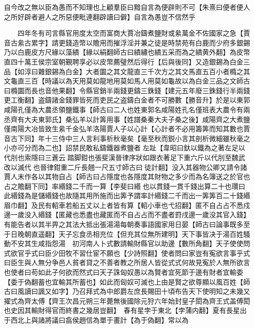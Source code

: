 自今改之無以臣為愚而不知理也上顧羣臣曰黯自言為便辟則不可【朱熹曰便者便人之所好辟者避人之所惡便毗連翻辟讀曰僻】自言為愚豈不信然乎

　　四年冬有司言縣官用度太空而富商大賈冶鑄煮鹽財或絫萬金不佐國家之急【賈音古絫古累字】請更錢造幣以贍用而摧浮淫并兼之徒是時禁苑有白鹿而少府多銀錫乃以白鹿皮方尺緣以藻繢【緣以絹翻師古曰繢繡也繢五采而為之繢黄外翻】為皮幣直四十萬王侯宗室朝覲聘享必以皮幣薦璧然后得行【后與後同】又造銀錫為白金三品【如淳曰雜銀錫為白金】大者圜之其文龍直三千次方之其文馬直五百小者橢之其文龜直三百【時議以為天用莫如龍地用莫如馬人用莫如龜故以為白金三品之文師古曰橢圜而長也音他果翻】令縣官銷半兩錢更鑄三銖錢【建元五年廢三銖錢行半兩錢更工衡翻】盗鑄諸金錢罪皆死而吏民之盗鑄白金者不可勝數【勝音升】於是以東郭咸陽孔僅為大農丞領鹽鐵事【師古曰二人也姓東郭名咸陽姓孔名僅班表大農令有兩丞齊有大夫東郭氏】桑弘羊以計筭用事【姓譜桑秦大夫子桑之後】咸陽齊之大煮鹽僅南陽大冶皆致生絫千金弘羊洛陽賈人子以心計【心計者不必用籌筭而知其數也賈音古下同】年十三侍中三人言利事析秋毫矣【毫至秋而鋭小言其剖析微細雖秋毫之小亦可分而為二也】詔禁民敢私鑄鐵器煮鹽者左趾【韋昭曰釱以鐵為之著左足以代刖也索隱曰三蒼云踏脚鉗也張斐漢晉律序狀如跟衣著足下重六斤以代刖至魏武改以滅代也晉律鉗重二斤長翹一尺五寸師古曰徒計翻】没入其器物公卿又請令諸賈人末作各以其物自占【師古曰占隱度也各隱度其財物之多少而為名簿送之於官也占之贍翻下同】率緡錢二千而一算【李斐曰緡也以貫錢一貫千錢出算二十也瓚曰此緡錢為是儲緡錢也故隨其用所施而出筭予謂率計緡錢二千而出一筭筭百二十錢緡眉巾翻】及民有軺車若船五丈以上者皆有算【軺小車也弋招翻】匿不自占占不悉戍邊一歲没入緡錢【匿藏也悉盡也藏匿而不自占占而不盡者罸戌邊一歲没其官入錢】有能告者以其半畀之其法大抵出張湯湯每朝奏事語國家用日晏【師古曰論事既多至于日晚朝直遥翻】天子忘食丞相充位【但充其位無所建明】天下事皆决于湯百姓騷動不安其生咸指怨湯　初河南人卜式數請輸財縣官以助邊【數所角翻】天子使使問式欲官乎式曰臣少田牧不習仕宦不願也【少詩照翻】使者問曰家豈有寃欲言事乎式曰臣生與人無分争邑人貧者貸之不善者教之所居人皆從式式何故見寃於人無所欲言也使者曰苟如此子何欲而然式曰天子誅匈奴愚以為賢者宜死節于邊有財者宜輸委【委于偽翻蓄也宜輸其所蓄也】如此而匈奴可滅也上由是賢之欲尊顯以風百姓【師古曰風讀曰諷又如字】乃召拜式為中郎爵左庶長賜田十頃布告天下使明知之未幾又擢式為齊太傅【齊王次昌元朔三年薨無後國除元狩六年始封皇子閎為齊王式盖傅閎也史因其輸財得官而終書之幾居豈翻】　春有星孛于東北【孛蒲内翻】夏有長星出于西北上與諸將議曰翕侯趙信為單于畫計【為于偽翻】常以為

